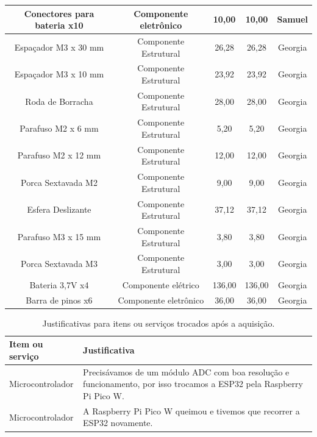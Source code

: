 \begin{table}[htpb]
\begin{tabular}{|c|c|c|c|c|}
Conectores para bateria x10 & Componente eletrônico & 10,00 & 10,00 & Samuel                     \\ \hline
Espaçador M3 x 30 mm & Componente Estrutural & 26,28 & 26,28 & Georgia                     \\ \hline
Espaçador M3 x 10 mm & Componente Estrutural & 23,92 & 23,92 & Georgia                     \\ \hline
Roda de Borracha & Componente Estrutural & 28,00   & 28,00 & Georgia                     \\ \hline
Parafuso M2 x 6 mm & Componente Estrutural & 5,20   & 5,20 & Georgia                     \\ \hline
Parafuso M2 x 12 mm & Componente Estrutural & 12,00   & 12,00 & Georgia                     \\ \hline
Porca Sextavada M2 & Componente Estrutural & 9,00   & 9,00 & Georgia                     \\ \hline
Esfera Deslizante & Componente Estrutural & 37,12   & 37,12 & Georgia                     \\ \hline
Parafuso M3 x 15 mm & Componente Estrutural & 3,80   & 3,80 & Georgia                     \\ \hline
Porca Sextavada M3 & Componente Estrutural & 3,00   & 3,00 & Georgia                     \\ \hline
Bateria 3,7V x4 & Componente elétrico & 136,00 & 136,00 &     Georgia                     \\ \hline
Barra de pinos x6 & Componente eletrônico & 36,00   & 36,00 & Georgia                    \\ \hline

\end{tabular}
\end{table}

\begin{table}[h]
\centering
\begin{tabularx}{\textwidth}{|l|X|} 
    \hline
    \textbf{Item ou serviço} & \textbf{Justificativa} \\ \hline
   Microcontrolador & Precisávamos de um módulo ADC com boa resolução e funcionamento,
     por isso trocamos a ESP32 pela Raspberry Pi Pico W. \\ \hline
     Microcontrolador & A Raspberry Pi Pico W queimou e tivemos que recorrer a ESP32 novamente. \\ \hline
\end{tabularx}
\caption{Justificativas para itens ou serviços trocados após a aquisição.}
\end{table}
